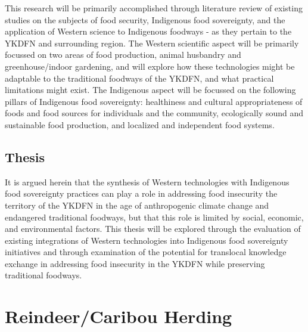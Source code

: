 \documentclass{report}
\begin{document}
\hspace{24pt} This research will be primarily accomplished through literature review of existing studies on the subjects of food security, Indigenous food sovereignty, and the application of Western science to Indigenous foodways - as they pertain to the YKDFN and surrounding region.
The Western scientific aspect will be primarily focussed on two areas of food production, animal husbandry and greenhouse/indoor gardening, and will explore how these technologies might be adaptable to the traditional foodways of the YKDFN, and what practical limitations might exist.
The Indigenous aspect will be focussed on the following pillars of Indigenous food sovereignty: healthiness and cultural appropriateness of foods and food sources for individuals and the community, ecologically sound and sustainable food production, and localized and independent food systems.

\subsection{Thesis}

\hspace{24pt} It is argued herein that the synthesis of Western technologies with Indigenous food sovereignty practices can play a role in addressing food insecurity the territory of the YKDFN in the age of anthropogenic climate change and endangered traditional foodways, but that this role is limited by social, economic, and environmental factors. 
This thesis will be explored through the evaluation of existing integrations of Western technologies into Indigenous food sovereignty initiatives and through examination of the potential for translocal knowledge exchange in addressing food insecurity in the YKDFN while preserving traditional foodways.

\section{Reindeer/Caribou Herding}
\end{document}
